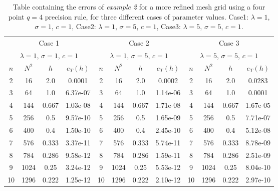 \documentclass{uonmathreport}
\begin{document}
\begin{table}[H]
	\centering
	\begin{tabular}{|c|c|c|c||c|c|c|c||c|c|c|c||}
		\hline
		\multicolumn{4}{|c||}{Case 1}&
		\multicolumn{4}{|c||}{Case 2}&
		\multicolumn{4}{|c||}{Case 3}\\
		\multicolumn{4}{|c||}{$\lambda=1$, $\sigma=1$, $c=1$}&
		\multicolumn{4}{|c||}{$\lambda=1$, $\sigma=5$, $c=1$}&
		\multicolumn{4}{|c||}{$\lambda=5$, $\sigma=5$, $c=1$}\\
		$n$&$N^2$&$h$&$e_T(h)$&
		$n$&$N^2$&$h$&$e_T(h)$&
		$n$&$N^2$&$h$&$e_T(h)$\\
		\hline \hline
		2&16&2.0&0.0001&
		2&16&2.0&0.0002&
		2&16&2.0&0.0283\\
		3&64&1.0&6.37e-07&
		3&64&1.0&1.14e-06&
		3&64&1.0&0.0001\\
		4&144&0.667&1.03e-08&
		4&144&0.667&1.71e-08&
		4&144&0.667&1.67e-05\\
		5&256&0.5&9.57e-10&
		5&256&0.5&1.65e-09&
		5&256&0.5&7.71e-07\\
		6&400&0.4&1.50e-10&
		6&400&0.4&2.45e-10&
		6&400&0.4&5.12e-08\\
		7&576&0.333&3.37e-11&
		7&576&0.333&5.74e-11&
		7&576&0.333&8.78e-09\\
		8&784&0.286&9.58e-12&
		8&784&0.286&1.59e-11&
		8&784&0.286&2.51e-09\\
		9&1024&0.25&3.24e-12&
		9&1024&0.25&5.53e-12&
		9&1024&0.25&8.04e-10\\
		10&1296&0.222&1.25e-12&
		10&1296&0.222&2.10e-12&
		10&1296&0.222&2.97e-10\\
		\hline
	\end{tabular}
	\caption{Table containing the errors of \textit{example 2} for a more refined mesh grid using a four point $q=4$ precision rule, for three different cases of parameter values. Case1: $\lambda=1$, $\sigma=1$, $c=1$, Case2: $\lambda=1$, $\sigma=5$, $c=1$, Case3: $\lambda=5$, $\sigma=5$, $c=1$.}
	\label{table:2dErrors_test2_q4}
\end{table}
\end{document}
